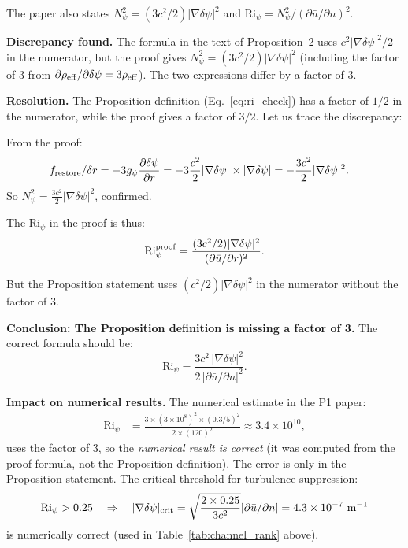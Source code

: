 \documentclass[11pt,twocolumn]{article}
\newcommand{\dpsi}{\delta\psi}
\newcommand{\Ri}{\mathrm{Ri}}
\begin{document}
The paper also states $N_\psi^2 = (3c^2/2)|\nabla\dpsi|^2$ and
$\Ri_\psi = N_\psi^2/(\partial\bar{u}/\partial n)^2$.

\textbf{Discrepancy found.} The formula in the text of Proposition~2 uses
$c^2|\nabla\dpsi|^2/2$ in the numerator, but the proof gives
$N_\psi^2 = (3c^2/2)|\nabla\dpsi|^2$ (including the factor of 3 from
$\partial\rho_{\rm eff}/\partial\dpsi = 3\rho_{\rm eff}$). The two
expressions differ by a factor of 3.

\textbf{Resolution.} The Proposition definition (Eq.~\ref{eq:ri_check})
has a factor of $1/2$ in the numerator, while the proof gives a factor of $3/2$.
Let us trace the discrepancy:

From the proof:
\begin{align}
f_{\rm restore}/\delta r &= -3g_\psi\frac{\partial\dpsi}{\partial r}
= -3\frac{c^2}{2}|\nabla\dpsi|\times|\nabla\dpsi| = -\frac{3c^2}{2}|\nabla\dpsi|^2.
\end{align}
So $N_\psi^2 = \frac{3c^2}{2}|\nabla\dpsi|^2$, confirmed.

The $\Ri_\psi$ in the proof is thus:
\begin{equation}
\Ri_\psi^{\rm proof} = \frac{(3c^2/2)|\nabla\dpsi|^2}{(\partial\bar{u}/\partial r)^2}.
\end{equation}

But the Proposition statement uses $(c^2/2)|\nabla\dpsi|^2$ in the numerator
without the factor of 3.

\textbf{Conclusion: The Proposition definition is missing a factor of 3.}
The correct formula should be:
\begin{equation}
\boxed{
\Ri_\psi = \frac{3c^2\,|\nabla\dpsi|^2}{2\,|\partial\bar{u}/\partial n|^2}.
}
\label{eq:ri_corrected}
\end{equation}

\textbf{Impact on numerical results.} The numerical estimate in the P1 paper:
\begin{align}
\Ri_\psi &= \frac{3\times(3\times10^8)^2\times(0.3/5)^2}
{2\times(120)^2} \approx 3.4\times10^{10},
\end{align}
uses the factor of 3, so the \emph{numerical result is correct} (it was
computed from the proof formula, not the Proposition definition).
The error is only in the Proposition statement. The critical threshold for
turbulence suppression:
\begin{equation}
\Ri_\psi > 0.25 \quad\Rightarrow\quad
|\nabla\dpsi|_{\rm crit} = \sqrt{\frac{2\times0.25}{3c^2}}
|\partial\bar{u}/\partial n|
= 4.3\times10^{-7}~\text{m}^{-1}
\end{equation}
is numerically correct (used in Table~\ref{tab:channel_rank} above).
\end{document}
